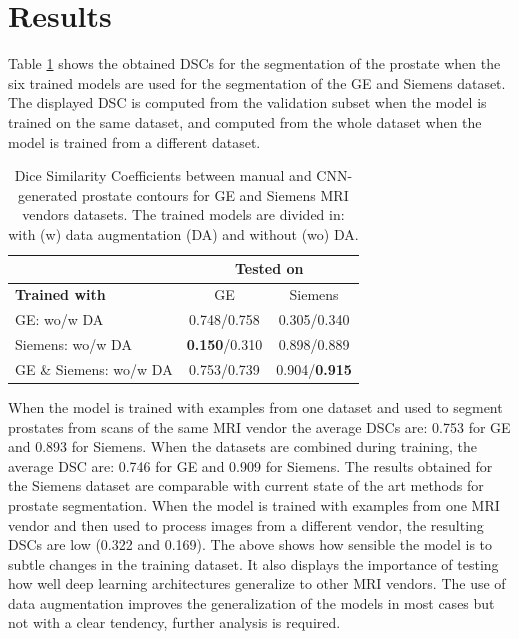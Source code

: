 \section{Results}

Table \ref{tab:res_prost} shows the obtained DSCs for the segmentation of the prostate
when the six trained models are used for the segmentation of the GE and Siemens dataset. 
The displayed DSC is computed from the validation subset when
the model is trained on the same dataset, and computed from the whole dataset when the
model is trained from a different dataset. 
\begin{table}[h]
    \centering
    \begin{tabular}{|l|c|c|}
         \hline
          & \multicolumn{2}{c|}{ \textbf{Tested on} } \\
         \hline
          \textbf{Trained with} &  GE & Siemens  \\
         \hline
         GE: wo/w DA & 0.748/0.758 & 0.305/0.340 \\
         \hline
         Siemens: wo/w DA & \textbf{0.150}/0.310 & 0.898/0.889\\
         \hline
         GE \& Siemens: wo/w DA & 0.753/0.739 & 0.904/\textbf{0.915}\\
         \hline
    \end{tabular}
    \caption{Dice Similarity Coefficients between manual and CNN-generated 
    prostate contours for GE and Siemens MRI vendors datasets. The trained
    models are divided in: with (w) data augmentation (DA) and without (wo) DA.}
    \label{tab:res_prost}
\end{table}
When the model is trained with examples from one dataset and used to segment
prostates from scans of the same MRI vendor the average DSCs are: 0.753 for GE 
and 0.893 for Siemens. When the datasets are combined during training, the 
average DSC are: 0.746 for GE and 0.909 for Siemens.
The results obtained for the Siemens dataset are comparable with 
current state of the art methods for prostate segmentation. When the model is 
trained with examples from one MRI vendor and then used to process images from a different vendor, the resulting DSCs are low (0.322 and 0.169). 
The above shows how sensible the model
is to subtle changes in the training dataset. It also displays the importance 
of testing how well deep learning architectures generalize to other MRI vendors. 
The use of data augmentation improves the generalization of the models in most cases
but not with a clear tendency, further analysis is required.

